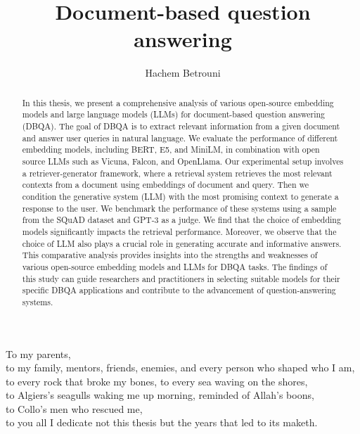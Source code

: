 \documentclass[a4paper,12pt]{article}
\author[1,2]{Hachem Betrouni}
\affil[1]{National Polytechnic school of Algiers, Industrial Engineering Department, Data Science and AI, Algiers, hachem.betrouni@g.enp.edu.dz}
\affil[2]{BIGmama technology, Algeria, hb@big-mama.io}
\title{Document-based question answering}
\begin{document}
\maketitle
\begin{abstract}
	In this thesis, we present a comprehensive analysis of various open-source embedding models and large language models (LLMs) for document-based question answering (DBQA). The goal of DBQA is to extract relevant information from a given document and answer user queries in natural language. We evaluate the performance of different embedding models, including BERT, E5, and MiniLM, in combination with open source LLMs such as Vicuna, Falcon, and OpenLlama.
	Our experimental setup involves a retriever-generator framework, where a retrieval system retrieves the most relevant contexts from a document using embeddings of document and query. Then we condition the generative system (LLM) with the most promising context to generate a response to the user. 
	We benchmark the performance of these systems using a sample from the SQuAD dataset and GPT-3 as a judge.
	We find that the choice of embedding models significantly impacts the retrieval performance. Moreover, we observe that the choice of LLM also plays a crucial role in generating accurate and informative answers.
	This comparative analysis provides insights into the strengths and weaknesses of various open-source embedding models and LLMs for DBQA tasks. 
	The findings of this study can guide researchers and practitioners in selecting suitable models for their specific DBQA applications and contribute to the advancement of question-answering systems.
\end{abstract}

\clearpage
\begin{center}
	\thispagestyle{empty}
	\vspace*{\fill}
	To my parents,\\
	to my family, mentors, friends, enemies, and every person who shaped who I am, \\
	to every rock that broke my bones, to every sea waving on the shores, \\  
	to Algiers's seagulls waking me up morning, reminded of Allah's boons,\\
	to Collo's men who rescued me,\\
	to you all I dedicate not this thesis but the years that led to its maketh.\\
	\vspace*{\fill}
\end{center}
\clearpage
\end{document}
